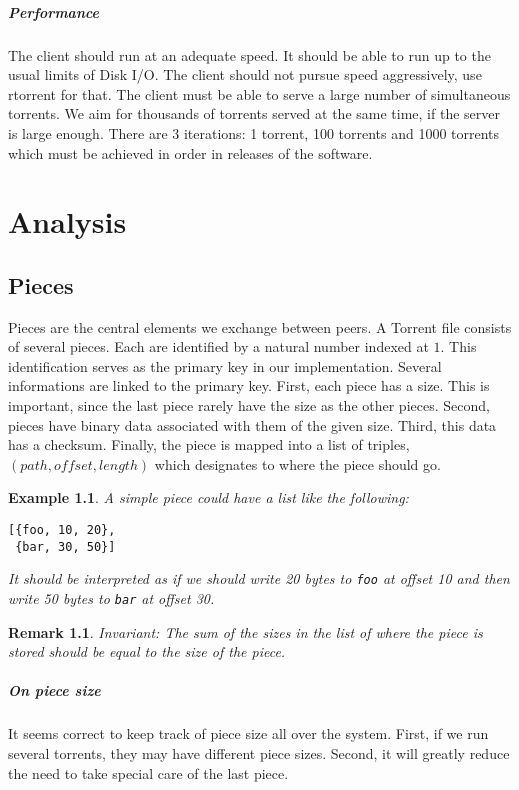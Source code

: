 \documentclass[a4paper]{report}
\newtheorem{example}{Example}
\newtheorem{remark}{Remark}
\begin{document}
\paragraph{Performance} The client should run at an adequate speed. It
should be able to run up to the usual limits of Disk I/O. The client
should not pursue speed aggressively, use rtorrent for that. The
client must be able to serve a large number of simultaneous
torrents. We aim for thousands of torrents served at the same time, if
the server is large enough. There are 3 iterations: 1 torrent, 100
torrents and 1000 torrents which must be achieved in order in
releases of the software.

\chapter{Analysis}
\section{Pieces}
Pieces are the central elements we exchange between peers. A Torrent
file consists of several pieces. Each are identified by a natural
number indexed at $1$. This identification serves as the primary key
in our implementation. Several informations are linked to the primary
key. First, each piece has a size. This is important, since the last
piece rarely have the size as the other pieces. Second, pieces have
binary data associated with them of the given size. Third, this data
has a checksum. Finally, the piece is mapped into a list of triples,
$(path, offset, length)$ which designates to where the piece should
go.
\begin{example}
  A simple piece could have a list like the following:
\begin{verbatim}
[{foo, 10, 20},
 {bar, 30, 50}]
\end{verbatim}
It should be interpreted as if we should write 20 bytes to
\texttt{foo} at offset 10 and then write 50 bytes to \texttt{bar} at
offset 30.
\end{example}
\begin{remark}
  Invariant: The sum of the sizes in the list of where the piece is
  stored should be equal to the size of the piece.
\end{remark}

\paragraph{On piece size}
It seems correct to keep track of piece size all over the
system. First, if we run several torrents, they may have different
piece sizes. Second, it will greatly reduce the need to take special
care of the last piece.
\end{document}
